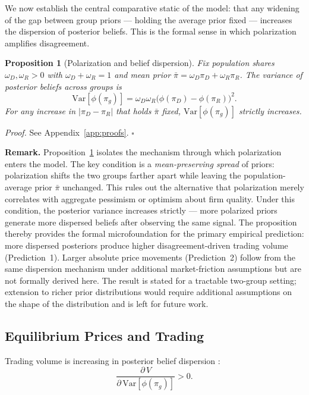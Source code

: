 \documentclass[12pt]{article}
\newtheorem{proposition}{Proposition}
\begin{document}
We now establish the central comparative static of the model: that any
widening of the gap between group priors --- holding the average prior
fixed --- increases the dispersion of posterior beliefs. This is the
formal sense in which polarization amplifies disagreement.

\begin{proposition}[Polarization and belief dispersion]
    \label{prop:dispersion}
    Fix population shares $\omega_D, \omega_R > 0$ with $\omega_D + \omega_R = 1$ and mean prior
    $\bar{\pi} = \omega_D \pi_D + \omega_R \pi_R$. The variance of posterior beliefs
    across groups is
    \[
        \mathrm{Var}[\phi(\pi_g)]
        = \omega_D \omega_R \bigl(\phi(\pi_D) - \phi(\pi_R)\bigr)^2.
    \]
    For any increase in $|\pi_D - \pi_R|$ that holds $\bar{\pi}$ fixed,
    $\mathrm{Var}[\phi(\pi_g)]$ strictly increases.
\end{proposition}

\noindent\textit{Proof.} See Appendix~\ref{app:proofs}. $\square$

\medskip
\noindent\textbf{Remark.} Proposition~\ref{prop:dispersion} isolates the
mechanism through which polarization enters the model. The key condition is
a \emph{mean-preserving spread} of priors: polarization shifts the two groups
farther apart while leaving the population-average prior $\bar{\pi}$ unchanged.
This rules out the alternative that polarization merely correlates with
aggregate pessimism or optimism about firm quality. Under this condition, the
posterior variance increases strictly --- more polarized priors generate more
dispersed beliefs after observing the same signal. The proposition thereby provides the formal microfoundation for the primary
empirical prediction: more dispersed posteriors produce higher
disagreement-driven trading volume (Prediction~1). Larger absolute price
movements (Prediction~2) follow from the same dispersion mechanism under
additional market-friction assumptions but are not formally derived here.
The result is stated for a tractable two-group setting; extension to
richer prior distributions would require additional assumptions on the
shape of the distribution and is left for future work.

\subsection{Equilibrium Prices and Trading}

Trading volume is increasing in posterior belief dispersion
\citep{harris1993, kandel1995}:
\begin{equation}
    \label{eq:volume}
    \frac{\partial\, V}{\partial\, \mathrm{Var}[\phi(\pi_g)]} > 0.
\end{equation}
\end{document}
